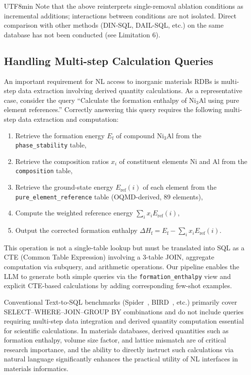 \documentclass[sn-mathphys,Numbered]{sn-jnl}
\begin{document}
\begin{CJK}{UTF8}{min}
Note that the above reinterprets single-removal ablation
conditions as incremental additions; interactions between
conditions are not isolated.
Direct comparison with other methods (DIN-SQL, DAIL-SQL, etc.) on
the same database has not been conducted (see Limitation 6).

\subsection{Handling Multi-step Calculation Queries}
\label{sec:multistep_query}

An important requirement for NL access to inorganic materials RDBs
is multi-step data extraction involving derived quantity calculations.
As a representative case, consider the query ``Calculate the
formation enthalpy of Ni$_3$Al using pure element references.''
Correctly answering this query requires the following multi-step
data extraction and computation:
\begin{enumerate}
  \item Retrieve the formation energy $E_\mathrm{f}$ of compound
    Ni$_3$Al from the \texttt{phase\_stability} table,
  \item Retrieve the composition ratios $x_i$ of constituent
    elements Ni and Al from the \texttt{composition} table,
  \item Retrieve the ground-state energy $E_\mathrm{ref}(i)$ of
    each element from the \texttt{pure\_element\_reference} table
    (OQMD-derived, 89 elements),
  \item Compute the weighted reference energy
    $\sum_i x_i E_\mathrm{ref}(i)$,
  \item Output the corrected formation enthalpy
    $\Delta H_\mathrm{f} = E_\mathrm{f} - \sum_i x_i E_\mathrm{ref}(i)$.
\end{enumerate}

This operation is not a single-table lookup but must be
translated into SQL as a CTE (Common Table Expression) involving
a 3-table JOIN, aggregate computation via subquery, and arithmetic
operations.
Our pipeline enables the LLM to generate both simple queries via
the \texttt{formation\_enthalpy} view and explicit CTE-based
calculations by adding corresponding few-shot examples.

Conventional Text-to-SQL benchmarks (Spider~\cite{yu2018spider},
BIRD~\cite{li2024bird}, etc.) primarily cover
SELECT--WHERE--JOIN--GROUP BY combinations and do not include
queries requiring multi-step data integration and derived quantity
computation essential for scientific calculations.
In materials databases,
derived quantities such as formation enthalpy, volume size factor,
and lattice mismatch are of critical research importance, and the
ability to directly instruct such calculations via natural language
significantly enhances the practical utility of NL interfaces in
materials informatics.


\end{CJK}
\end{document}
